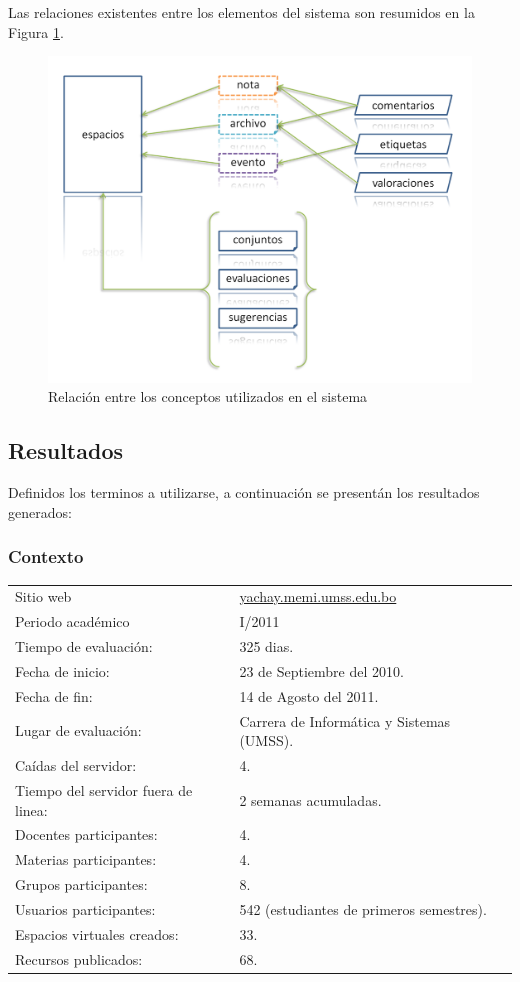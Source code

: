 Las relaciones existentes entre los elementos del sistema son resumidos en la Figura \ref{nomenclatura}.
\begin{figure}[H]
\centering
 \includegraphics[scale=0.25]{graphics/nomenclatura.png}
 \caption {Relaci\'on entre los conceptos utilizados en el sistema}
 \label {nomenclatura}
\end{figure}

\subsection{Resultados}
Definidos los terminos a utilizarse, a continuaci\'on se present\'an los resultados generados:

\subsubsection{Contexto}
\begin{center}
\begin{tabular}{|l|l|}
\hline
Sitio web & \url{yachay.memi.umss.edu.bo} \\
Periodo acad\'emico & I/2011 \\
Tiempo de evaluaci\'on: & 325 dias. \\
Fecha de inicio: & 23 de Septiembre del 2010. \\
Fecha de fin: & 14 de Agosto del 2011. \\
Lugar de evaluaci\'on: & Carrera de Inform\'atica y Sistemas (UMSS). \\
Ca\'idas del servidor: & 4. \\
Tiempo del servidor fuera de linea: & 2 semanas acumuladas. \\
Docentes participantes: & 4. \\
Materias participantes: & 4. \\
Grupos participantes: & 8. \\
Usuarios participantes: & 542 (estudiantes de primeros semestres). \\
Espacios virtuales creados: & 33. \\
Recursos publicados: & 68. \\
\hline
\end{tabular}
\end{center}

